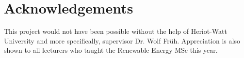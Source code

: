 \section{Acknowledgements}

This project would not have been possible without the help of Heriot-Watt University and more specifically, supervisor Dr. Wolf Fr\"uh. Appreciation is also shown to all lecturers who taught the Renewable Energy MSc this year. %